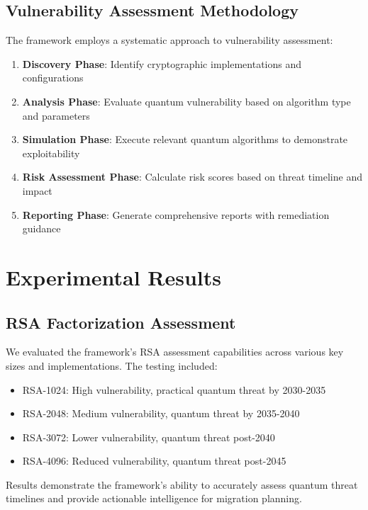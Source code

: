 \documentclass[11pt]{article}
\begin{document}
\subsection{Vulnerability Assessment Methodology}

The framework employs a systematic approach to vulnerability assessment:

\begin{enumerate}
\item \textbf{Discovery Phase}: Identify cryptographic implementations and configurations
\item \textbf{Analysis Phase}: Evaluate quantum vulnerability based on algorithm type and parameters
\item \textbf{Simulation Phase}: Execute relevant quantum algorithms to demonstrate exploitability
\item \textbf{Risk Assessment Phase}: Calculate risk scores based on threat timeline and impact
\item \textbf{Reporting Phase}: Generate comprehensive reports with remediation guidance
\end{enumerate}

\section{Experimental Results}

\subsection{RSA Factorization Assessment}

We evaluated the framework's RSA assessment capabilities across various key sizes and implementations. The testing included:

\begin{itemize}
\item RSA-1024: High vulnerability, practical quantum threat by 2030-2035
\item RSA-2048: Medium vulnerability, quantum threat by 2035-2040
\item RSA-3072: Lower vulnerability, quantum threat post-2040
\item RSA-4096: Reduced vulnerability, quantum threat post-2045
\end{itemize}

Results demonstrate the framework's ability to accurately assess quantum threat timelines and provide actionable intelligence for migration planning.
\end{document}
